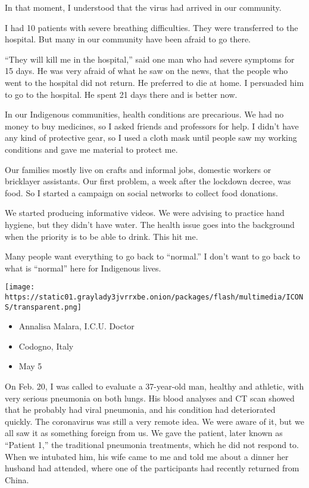In that moment, I understood that the virus had arrived in our
community.

I had 10 patients with severe breathing difficulties. They were
transferred to the hospital. But many in our community have been afraid
to go there.

``They will kill me in the hospital,'' said one man who had severe
symptoms for 15 days. He was very afraid of what he saw on the news,
that the people who went to the hospital did not return. He preferred to
die at home. I persuaded him to go to the hospital. He spent 21 days
there and is better now.

In our Indigenous communities, health conditions are precarious. We had
no money to buy medicines, so I asked friends and professors for help. I
didn't have any kind of protective gear, so I used a cloth mask until
people saw my working conditions and gave me material to protect me.

Our families mostly live on crafts and informal jobs, domestic workers
or bricklayer assistants. Our first problem, a week after the lockdown
decree, was food. So I started a campaign on social networks to collect
food donations.

We started producing informative videos. We were advising to practice
hand hygiene, but they didn't have water. The health issue goes into the
background when the priority is to be able to drink. This hit me.

Many people want everything to go back to ``normal.'' I don't want to go
back to what is ``normal'' here for Indigenous lives.

\texttt{[image: https://static01.graylady3jvrrxbe.onion/packages/flash/multimedia/ICONS/transparent.png]}

\begin{itemize}
\tightlist
\item
  Annalisa Malara, I.C.U. Doctor
\item
  Codogno, Italy
\item
  May 5
\end{itemize}

On Feb. 20, I was called to evaluate a 37-year-old man, healthy and
athletic, with very serious pneumonia on both lungs. His blood analyses
and CT scan showed that he probably had viral pneumonia, and his
condition had deteriorated quickly. The coronavirus was still a very
remote idea. We were aware of it, but we all saw it as something foreign
from us. We gave the patient, later known as ``Patient 1,'' the
traditional pneumonia treatments, which he did not respond to. When we
intubated him, his wife came to me and told me about a dinner her
husband had attended, where one of the participants had recently
returned from China.


